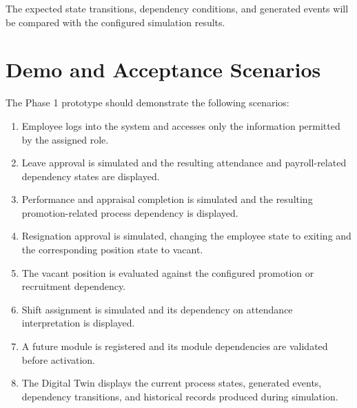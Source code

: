 \documentclass[12pt,a4paper]{article}
\begin{document}
The expected state transitions, dependency conditions, and generated
events will be compared with the configured simulation results.


\section{Demo and Acceptance Scenarios}

The Phase 1 prototype should demonstrate the following scenarios:

\begin{enumerate}

    \item Employee logs into the system and accesses only the
    information permitted by the assigned role.

    \item Leave approval is simulated and the resulting attendance
    and payroll-related dependency states are displayed.

    \item Performance and appraisal completion is simulated and the
    resulting promotion-related process dependency is displayed.

    \item Resignation approval is simulated, changing the employee
    state to exiting and the corresponding position state to vacant.

    \item The vacant position is evaluated against the configured
    promotion or recruitment dependency.

    \item Shift assignment is simulated and its dependency on
    attendance interpretation is displayed.

    \item A future module is registered and its module dependencies
    are validated before activation.

    \item The Digital Twin displays the current process states,
    generated events, dependency transitions, and historical records
    produced during simulation.

\end{enumerate}

\end{document}
